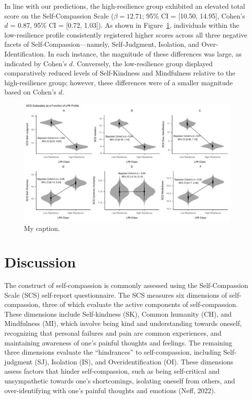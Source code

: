 \documentclass[
  man,floatsintext]{apa7}
\begin{document}
In line with our predictions, the high-resilience group exhibited an elevated total score on the Self-Compassion Scale (\(\beta = 12.71\); 95\% CI = {[}10.50, 14.95{]}, Cohen's \(d\) = 0.87, 95\% CI = {[}0.72, 1.03{]}). As shown in Figure~\ref{fig:scs-comparisons}, individuals within the low-resilience profile consistently registered higher scores across all three negative facets of Self-Compassion---namely, Self-Judgment, Isolation, and Over-Identification. In each instance, the magnitude of these differences was large, as indicated by Cohen's \(d\). Conversely, the low-resilience group displayed comparatively reduced levels of Self-Kindness and Mindfulness relative to the high-resilience group; however, these differences were of a smaller magnitude based on Cohen's \(d\).

\begin{figure}
\centering
\includegraphics{figures/scs_subscales_lpa.pdf}
\caption{\label{fig:scs-comparisons}My caption.}
\end{figure}

\hypertarget{discussion}{%
\section{Discussion}\label{discussion}}

The construct of self-compassion is commonly assessed using the Self-Compassion Scale (SCS) self-report questionnaire. The SCS measures six dimensions of self-compassion, three of which evaluate the active components of self-compassion. These dimensions include Self-kindness (SK), Common humanity (CH), and Mindfulness (MI), which involve being kind and understanding towards oneself, recognizing that personal failures and pain are common experiences, and maintaining awareness of one's painful thoughts and feelings. The remaining three dimensions evaluate the ``hindrances'' to self-compassion, including Self-judgment (SJ), Isolation (IS), and Overidentification (OI). These dimensions assess factors that hinder self-compassion, such as being self-critical and unsympathetic towards one's shortcomings, isolating oneself from others, and over-identifying with one's painful thoughts and emotions (Neff, 2022).
\end{document}
